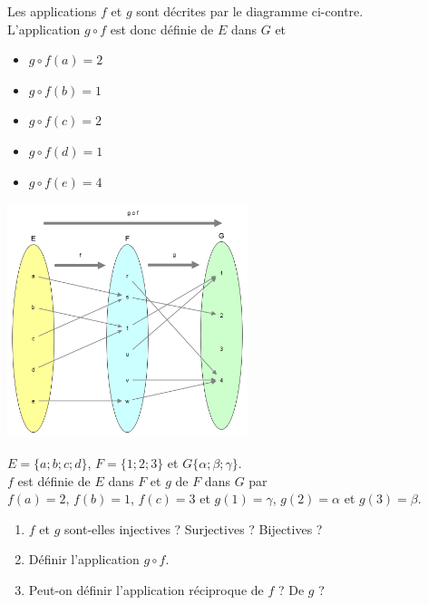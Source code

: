 \begin{exemple}[]
    Les applications $f$ et $g$ sont décrites par le diagramme ci-contre.\\
    L'application $g\circ f$ est donc définie de $E$ dans $G$ et
    \begin{itemize}
        \item 	$g\circ f(a)=2$
        \item 	$g\circ f(b)=1$
        \item 	$g\circ f(c)=2$
        \item 	$g\circ f(d)=1$
        \item 	$g\circ f(e)=4$
    \end{itemize}
    \begin{center}
        \includegraphics[width=7cm]{ensembles/img/compo.png}
    \end{center}
\end{exemple}

\begin{exercice}[]
    $E=\lbrace a;b;c;d\rbrace$, $F=\lbrace 1;2;3\rbrace$ et $G\lbrace \alpha;\beta;\gamma\rbrace$.\\
    $f$ est définie de $E$ dans $F$  et $g$ de $F$ dans $G$ par\\
    $f(a)=2$, $f(b)=1$, $f(c)=3$ et $g(1)=\gamma$, $g(2)=\alpha$ et $g(3)=\beta$.
    \begin{enumerate}
        \item 	$f$ et $g$ sont-elles injectives ? Surjectives ? Bijectives ?
        \item 	Définir l'application $g\circ f$.
        \item 	Peut-on définir l'application réciproque de $f$ ? De $g$ ?
    \end{enumerate}
\end{exercice}

